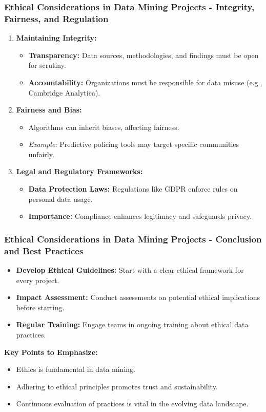 \documentclass[aspectratio=169]{beamer}
\begin{document}
\begin{frame}[fragile]
    \frametitle{Ethical Considerations in Data Mining Projects - Integrity, Fairness, and Regulation}
    \begin{enumerate}
        \item \textbf{Maintaining Integrity:}
            \begin{itemize}
                \item \textbf{Transparency:} Data sources, methodologies, and findings must be open for scrutiny.
                \item \textbf{Accountability:} Organizations must be responsible for data misuse (e.g., Cambridge Analytica).
            \end{itemize}
        \item \textbf{Fairness and Bias:}
            \begin{itemize}
                \item Algorithms can inherit biases, affecting fairness.
                \item \textit{Example:} Predictive policing tools may target specific communities unfairly.
            \end{itemize}
        \item \textbf{Legal and Regulatory Frameworks:}
            \begin{itemize}
                \item \textbf{Data Protection Laws:} Regulations like GDPR enforce rules on personal data usage.
                \item \textbf{Importance:} Compliance enhances legitimacy and safeguards privacy.
            \end{itemize}
    \end{enumerate}
\end{frame}

\begin{frame}[fragile]
    \frametitle{Ethical Considerations in Data Mining Projects - Conclusion and Best Practices}
    \begin{itemize}
        \item \textbf{Develop Ethical Guidelines:} Start with a clear ethical framework for every project.
        \item \textbf{Impact Assessment:} Conduct assessments on potential ethical implications before starting.
        \item \textbf{Regular Training:} Engage teams in ongoing training about ethical data practices.
    \end{itemize}
    \textbf{Key Points to Emphasize:}
    \begin{itemize}
        \item Ethics is fundamental in data mining.
        \item Adhering to ethical principles promotes trust and sustainability.
        \item Continuous evaluation of practices is vital in the evolving data landscape.
    \end{itemize}
\end{frame}
\end{document}
